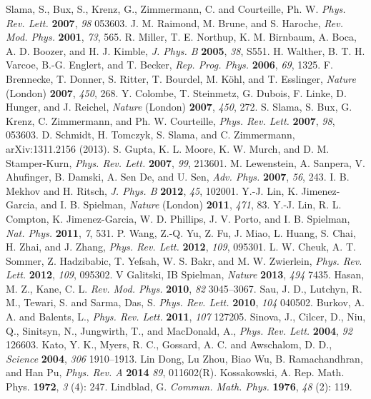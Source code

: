\documentclass[atoms,article,submit,moreauthors,pdftex,12pt,a4paper]{mdpi}
\begin{document}
\begin{thebibliography}{999}
Slama, S., Bux, S., Krenz, G., Zimmermann, C. and Courteille, Ph. W. {\em Phys. Rev. Lett.} {\bf 2007}, {\em 98} 053603.
J. M. Raimond, M. Brune, and S. Haroche, {\em Rev. Mod. Phys.} {\bf 2001}, {\em 73}, 565.
R. Miller, T. E. Northup, K. M. Birnbaum, A. Boca, A. D. Boozer, and H. J. Kimble, {\em J. Phys. B} {\bf 2005}, {\em 38}, S551.
H. Walther, B. T. H. Varcoe, B.-G. Englert, and T. Becker, {\em Rep. Prog. Phys.} {\bf 2006}, {\em 69}, 1325.
F. Brennecke, T. Donner, S. Ritter, T. Bourdel, M. Köhl, and T. Esslinger, {\em Nature} (London) {\bf 2007}, {\em 450}, 268.
Y. Colombe, T. Steinmetz, G. Dubois, F. Linke, D. Hunger, and J. Reichel, {\em Nature} (London) {\bf 2007}, {\em 450}, 272.
S. Slama, S. Bux, G. Krenz, C. Zimmermann, and Ph. W. Courteille, {\em Phys. Rev. Lett.} {\bf 2007}, {\em 98}, 053603.
D. Schmidt, H. Tomczyk, S. Slama, and C. Zimmermann, arXiv:1311.2156 (2013).
S. Gupta, K. L. Moore, K. W. Murch, and D. M. Stamper-Kurn, {\em Phys. Rev. Lett.} {\bf 2007}, {\em 99}, 213601.
M. Lewenstein, A. Sanpera, V. Ahufinger, B. Damski, A. Sen De, and U. Sen, {\em Adv. Phys.} {\bf 2007}, {\em 56}, 243.
I. B. Mekhov and H. Ritsch, {\em J. Phys. B} {\bf 2012}, {\em 45}, 102001.
Y.-J. Lin, K. Jimenez-Garcia, and I. B. Spielman, {\em Nature} (London) {\bf 2011}, {\em 471}, 83.
Y.-J. Lin, R. L. Compton, K. Jimenez-Garcia, W. D. Phillips, J. V. Porto, and I. B. Spielman, {\em Nat. Phys.} {\bf 2011}, {\em 7}, 531.
P. Wang, Z.-Q. Yu, Z. Fu, J. Miao, L. Huang, S. Chai, H. Zhai, and J. Zhang, {\em Phys. Rev. Lett.} {\bf 2012}, {\em 109}, 095301.
L. W. Cheuk, A. T. Sommer, Z. Hadzibabic, T. Yefsah, W. S. Bakr, and M. W. Zwierlein, {\em Phys. Rev. Lett.} {\bf 2012}, {\em 109}, 095302.
V Galitski, IB Spielman, {\em Nature} {\bf 2013}, {\em 494} 7435.
Hasan, M. Z., Kane, C. L. {\em Rev. Mod. Phys.} {\bf 2010}, {\em 82} 3045–3067.
Sau, J. D., Lutchyn, R. M., Tewari, S. and Sarma, Das, S. {\em Phys. Rev. Lett.} {\bf 2010}, {\em 104} 040502.
Burkov, A. A. and Balents, L.,  {\em Phys. Rev. Lett.} {\bf 2011}, {\em 107} 127205. 
Sinova, J., Cilcer, D., Niu, Q., Sinitsyn, N., Jungwirth, T., and MacDonald, A.,  {\em Phys. Rev. Lett.} {\bf 2004}, {\em 92} 126603.
Kato, Y. K., Myers, R. C., Gossard, A. C. and Awschalom, D. D.,  {\em Science} {\bf 2004}, {\em 306} 1910–1913.
Lin Dong, Lu Zhou, Biao Wu, B. Ramachandhran, and Han Pu, {\em Phys. Rev. A} {\bf 2014} {\em 89}, 011602(R).
Kossakowski, A. { Rep. Math. Phys.} {\bf 1972}, {\em 3} (4): 247.
Lindblad, G. {\em Commun. Math. Phys.} {\bf 1976}, {\em 48} (2): 119.
\end{thebibliography}
\end{document}
